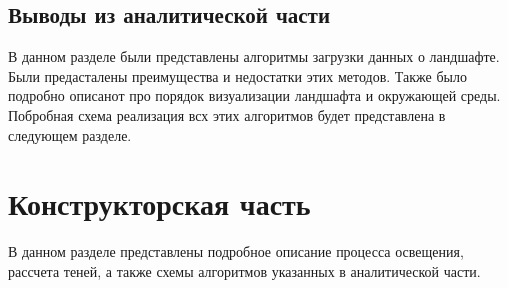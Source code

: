 \documentclass[a4paper, 10pt]{article}
\begin{document}
	 \subsection{Выводы из аналитической части}
	 \hspace*{5mm} В данном разделе были представлены алгоритмы загрузки данных о ландшафте. Были предасталены преимущества и недостатки этих методов. Также было подробно описанот про порядок визуализации ландшафта и окружающей среды. Побробная схема реализация всх этих алгоритмов будет представлена в следующем разделе. 
\clearpage
\newpage
\section{Конструкторская часть}
	 \hspace*{5mm} В данном разделе представлены подробное описание процесса освещения, рассчета теней, а также схемы алгоритмов указанных в аналитической части.
\end{document}
